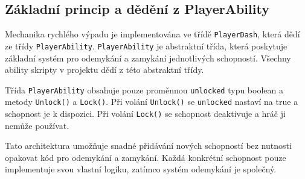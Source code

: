 \subsection{Základní princip a dědění z PlayerAbility}

Mechanika rychlého výpadu je implementována ve třídě \texttt{PlayerDash}, která dědí ze třídy \texttt{PlayerAbility}. \texttt{PlayerAbility} je abstraktní třída, která poskytuje základní systém pro odemykání a zamykání jednotlivých schopností. Všechny ability skripty v projektu dědí z této abstraktní třídy.

Třída \texttt{PlayerAbility} obsahuje pouze proměnnou \texttt{unlocked} typu boolean a metody \texttt{Unlock()} a \texttt{Lock()}. Při volání \texttt{Unlock()} se \texttt{unlocked} nastaví na true a schopnost je k dispozici. Při volání \texttt{Lock()} se schopnost deaktivuje a hráč ji nemůže používat.

Tato architektura umožňuje snadné přidávání nových schopností bez nutnosti opakovat kód pro odemykání a zamykání. Každá konkrétní schopnost pouze implementuje svou vlastní logiku, zatímco systém odemykání je společný.